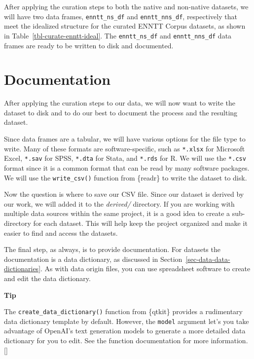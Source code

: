 \documentclass[
  letterpaper,
  krantz1]{latex/krantz-mod}
\newcommand{\cindex}[1]{%
  \StrSubstitute{#1}{_}{\_}[\temp]%
  \index{\temp}%
}
\theoremstyle{definition}
\theoremstyle{definition}
\theoremstyle{remark}
\begin{document}
After applying the curation steps to both the native and non-native
datasets, we will have two data frames, \texttt{enntt\_ns\_df} and
\texttt{enntt\_nns\_df}, respectively that meet the idealized structure
for the curated ENNTT Corpus datasets, as shown in
Table~\ref{tbl-curate-enntt-ideal}. The \texttt{enntt\_ns\_df} and
\texttt{enntt\_nns\_df} data frames are ready to be written to disk and
documented.

\section{Documentation}\label{documentation}

After applying the curation steps to our data, we will now want to write
the dataset to disk and to do our best to document the process and the
resulting dataset.

Since data frames are a tabular, we will have various options for the
file type to write. Many of these formats are software-specific, such as
\texttt{*.xlsx} for Microsoft Excel, \texttt{*.sav} for SPSS,
\texttt{*.dta} for Stata, and \texttt{*.rds} for R. We will use the
\texttt{*.csv} format since it is a common format that can be read by
many software packages. We will use the \texttt{write\_csv()} function
from \{readr\} to write the dataset to disk.

Now the question is where to save our CSV file. Since our dataset is
derived by our work, we will added it to the \emph{derived/} directory.
If you are working with multiple data sources within the same project,
it is a good idea to create a sub-directory for each dataset. This will
help keep the project organized and make it easier to find and access
the datasets.

The final step, as always, is to provide documentation. For datasets the
documentation is a data dictionary, as discussed
in Section~\ref{sec-data-data-dictionaries}. As with data origin files,
you can use spreadsheet software to create and edit the data dictionary.

\begin{tcolorbox}[enhanced jigsaw, toprule=.15mm, breakable, colback=white, arc=.35mm, left=2mm, colframe=quarto-callout-color-frame, opacityback=0, bottomrule=.15mm, rightrule=.15mm, leftrule=.75mm]

\textbf{ Tip}

The \texttt{create\_data\_dictionary()} function from \{qtkit\} provides
a rudimentary data dictionary template by default. However, the
\texttt{model} argument let's you take advantage of OpenAI's text
generation models to generate a more detailed data dictionary for you to
edit. See the function documentation for more information.
\cindex{create_data_dictionary()}

\end{tcolorbox}
\end{document}
